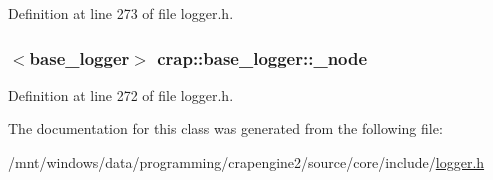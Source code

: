 Definition at line 273 of file logger.\+h.

\hypertarget{classcrap_1_1base__logger_aa580a45655e76efb8e5c1dbe81ff4ed8}{
\subsubsection[{\+\_\+node}]{$<${\bf base\+\_\+logger}$>$ crap\+::base\+\_\+logger\+::\+\_\+node\hspace{0.3cm}{\ttfamily [protected]}}}\label{classcrap_1_1base__logger_aa580a45655e76efb8e5c1dbe81ff4ed8}


Definition at line 272 of file logger.\+h.



The documentation for this class was generated from the following file\+:\begin{DoxyCompactItemize}
\item 
/mnt/windows/data/programming/crapengine2/source/core/include/\hyperlink{logger_8h}{logger.\+h}\end{DoxyCompactItemize}

